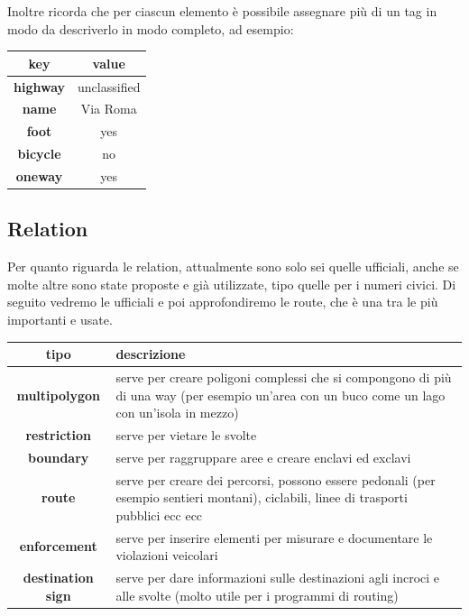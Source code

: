 \documentclass[a4paper,twoside,12pt,]{article}
\newcommand{\key}[1]{\textsf{\textbf{#1}}}
\newcommand{\val}[1]{\textsf{#1}}
\begin{document}
Inoltre ricorda che per ciascun elemento è possibile assegnare più di un tag in modo da descriverlo in modo completo, ad esempio:
\begin{center}
 \begin{tabular}{cc}
  \toprule
   \textbf{key} & \textbf{value} \\
  \midrule
   \key{highway} & \val{unclassified} \\
   \key{name} & \val{Via Roma} \\
   \key{foot} & \val{yes} \\
   \key{bicycle} & \val{no} \\
   \key{oneway} & \val{yes} \\
  \bottomrule
 \end{tabular}
\end{center}

\subsection{Relation}
Per quanto riguarda le relation, attualmente sono solo sei quelle ufficiali, anche se molte altre sono state proposte e già utilizzate, tipo quelle per i numeri civici. Di seguito vedremo le ufficiali e poi approfondiremo le route, che è una tra le più importanti e usate.
\begin{center}
 \begin{tabular}{c p{9cm}}
  \toprule
   \textbf{tipo} & \textbf{descrizione} \\
  \midrule
   \key{multipolygon} & serve per creare poligoni complessi che si compongono di più di una way (per esempio un'area con un buco come un lago con un'isola in mezzo) \\
   \key{restriction}	& serve per vietare le svolte \\
   \key{boundary}	& serve per raggruppare aree e creare enclavi ed exclavi \\
   \key{route} & serve per creare dei percorsi, possono essere pedonali (per esempio sentieri montani), ciclabili, linee di trasporti pubblici ecc ecc \\
   \key{enforcement} & serve per inserire elementi per misurare e documentare le violazioni veicolari \\
   \key{destination sign} & serve per dare informazioni sulle destinazioni agli incroci e alle svolte (molto utile per i programmi di routing) \\
  \bottomrule
\end{tabular}
\end{center}
\end{document}
